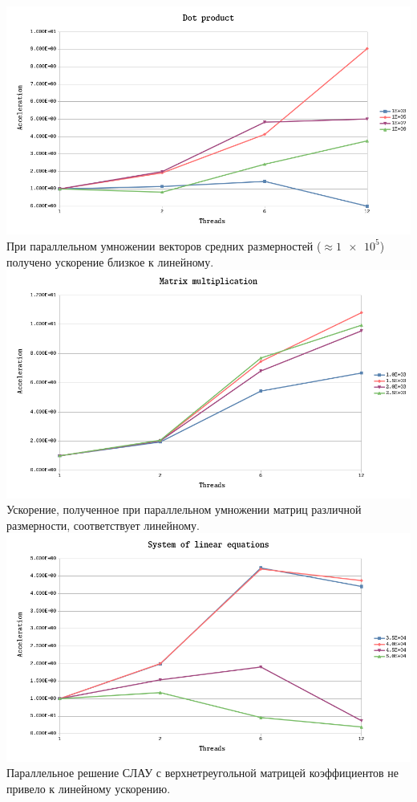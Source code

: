 \documentclass[12pt, a4paper]{article}
\begin{document}
\begin{center}
\includegraphics[scale=0.4]{dot-product} \\
При параллельном умножении векторов средних размерностей ($\approx \num{1e+5}$) получено ускорение
близкое к линейному. \\
\vspace{15mm}
\includegraphics[scale=0.4]{mmlt}        \\
Ускорение, полученное при параллельном умножении матриц различной размерности, соответствует линейному. \\
\includegraphics[scale=0.4]{sle}         \\
Параллельное решение СЛАУ с верхнетреугольной матрицей коэффициентов не привело к линейному ускорению.
\end{center}
\end{document}
